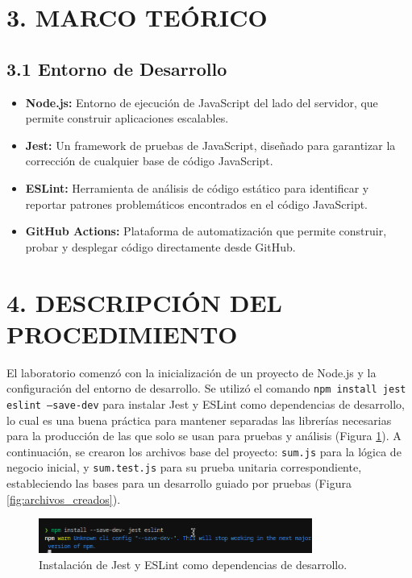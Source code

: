 \documentclass[12pt, a4paper]{article}
\begin{document}
\section*{3. MARCO TE\'ORICO}
\subsection*{3.1 Entorno de Desarrollo}
\begin{itemize}
    \item \textbf{Node.js:} Entorno de ejecuci\'on de JavaScript del lado del servidor, que permite construir aplicaciones escalables.
    \item \textbf{Jest:} Un framework de pruebas de JavaScript, dise\~nado para garantizar la correcci\'on de cualquier base de c\'odigo JavaScript.
    \item \textbf{ESLint:} Herramienta de an\'alisis de c\'odigo est\'atico para identificar y reportar patrones problem\'aticos encontrados en el c\'odigo JavaScript.
    \item \textbf{GitHub Actions:} Plataforma de automatizaci\'on que permite construir, probar y desplegar c\'odigo directamente desde GitHub.
\end{itemize}

\section*{4. DESCRIPCI\'ON DEL PROCEDIMIENTO}
El laboratorio comenz\'o con la inicializaci\'on de un proyecto de Node.js y la configuraci\'on del entorno de desarrollo. Se utiliz\'o el comando \texttt{npm install jest eslint --save-dev} para instalar Jest y ESLint como dependencias de desarrollo, lo cual es una buena pr\'actica para mantener separadas las librer\'ias necesarias para la producci\'on de las que solo se usan para pruebas y an\'alisis (Figura \ref{fig:install_jest}). A continuaci\'on, se crearon los archivos base del proyecto: \texttt{sum.js} para la l\'ogica de negocio inicial, y \texttt{sum.test.js} para su prueba unitaria correspondiente, estableciendo las bases para un desarrollo guiado por pruebas (Figura \ref{fig:archivos_creados}).

\begin{figure}[H]
    \centering
    \includegraphics[width=0.8\textwidth]{img/instalar modo desarrollo jest eslint.png}
    \caption{Instalaci\'on de Jest y ESLint como dependencias de desarrollo.}
    \label{fig:install_jest}
\end{figure}
\end{document}
